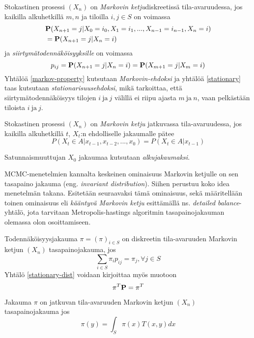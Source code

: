 \begin{maar}\label{markovin-ehto-d}
	Stokastinen prosessi $(X_n)$ on \textit{Markovin ketju}diskreetissä tila-avaruudessa, jos kaikilla alkuhetkillä $m,n$ ja tiloilla $i,j\in S$ on voimassa
	\begin{equation}\label{markov-property}
		\begin{split}
			&\textbf{P}(X_{n+1}=j|X_0=i_0,X_1=i_1,...,X_{n-1}=i_{n-1},X_n=i) \\
		 &= \textbf{P}(X_{n+1}=j|X_n=i) 
		\end{split}
	\end{equation}
	ja \textit{siirtymätodennäköisyyksille} on voimassa 
	\begin{equation}\label{stationary}
		p_{ij}=\textbf{P}(X_{n+1}=j|X_n=i)=\textbf{P}(X_{m+1}=j|X_m=i)
	\end{equation}
	Yhtälöä \ref{markov-property} kutsutaan \textit{Markovin-ehdoksi} ja yhtälöä \ref{stationary} taas kutsutaan \textit{stationarisuusehdoksi}, mikä tarkoittaa, 
	että siirtymätodennäköisyys tilojen $i\ \text{ja}\ j$ välillä ei riipu ajasta $m\ \text{ja}\ n$, vaan pelkästään tiloista $i\ \text{ja}\ j$.
\end{maar}

\begin{maar}\label{markov-maar-c}
	Stokastinen prosessi $(X_n)$ on \textit{Markovin ketju} jatkuvassa tila-avaruudessa, jos kaikilla alkuhetkillä $t$, $X_t$:n ehdolliselle jakaumalle pätee
	\begin{equation}
		P(X_t\in A | x_{t-1},x_{t-2},...,x_0) = 	P(X_t\in A | x_{t-1})
	\end{equation}
\end{maar}

\begin{maar}
	Satunnaismuuttujan $X_0$ jakaumaa kutsutaan \textit{alkujakaumaksi}. 
\end{maar}

MCMC-menetelmien kannalta keskeinen ominaisuus Markovin ketjulle on sen tasapaino jakauma (eng. \textit{invariant distribution}). Siihen perustuu koko idea menetelmän takana. Esitetään seuraavaksi tämä ominaisuus, sekä määritellään toinen ominaisuus eli \textit{kääntyvä Markovin ketju} esittämällä ns. \textit{detailed balance}-yhtälö, jota tarvitaan Metropolis-hastings algoritmin tasapainojakauman olemassa olon osoittamiseen. 

\begin{maar}
	Todennäköisyysjakauma $\pi=(\pi)_{i\in S}$ on diskreetin tila-avaruuden Markovin ketjun $(X_n)$ tasapainojakauma, jos 
	\begin{equation}\label{stationary-dist}
		\sum_{i\in S} \pi_i p_{ij}=\pi_j, \forall j\in S
	\end{equation}
	Yhtälö \ref{stationary-dist} voidaan kirjoittaa myös muotoon 
	\begin{equation}\label{stationary-dist2}
		\pi^T\textbf{P}= \pi^T
	\end{equation}
	
	Jakauma $\pi$ on jatkuvan tila-avaruuden Markovin ketjun $( X_n )$ tasapainojakauma jos 
	\begin{equation}
		\pi(y) = \int_S \pi(x) T(x,y) dx
	\end{equation}
\end{maar}

